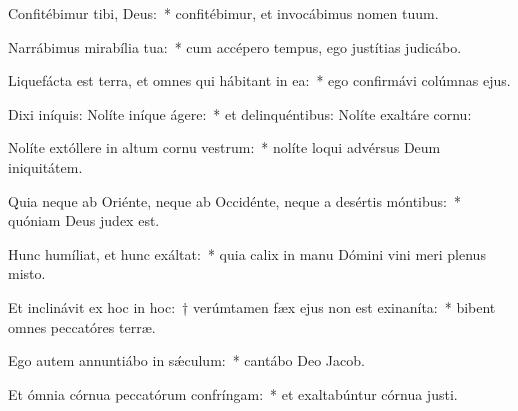 \item Confitébimur tibi, Deus:~* confitébimur, et invocábimus nomen tuum.

\item Narrábimus mirabília tua:~* cum accépero tempus, ego justítias judicábo.

\item Liquefácta est terra, et omnes qui hábitant in ea:~* ego confirmávi colúmnas ejus.

\item Dixi iníquis: Nolíte iníque ágere:~* et delinquéntibus: Nolíte exaltáre cornu:

\item Nolíte extóllere in altum cornu vestrum:~* nolíte loqui advérsus Deum iniquitátem.

\item Quia neque ab Oriénte, neque ab Occidénte, neque a desértis móntibus:~* quóniam Deus judex est.

\item Hunc humíliat, et hunc exáltat:~* quia calix in manu Dómini vini meri plenus misto.

\item Et inclinávit ex hoc in hoc:~† verúmtamen fæx ejus non est exinaníta:~* bibent omnes peccatóres terræ.

\item Ego autem annuntiábo in sǽculum:~* cantábo Deo Jacob.

\item Et ómnia córnua peccatórum confríngam:~* et exaltabúntur córnua justi.


